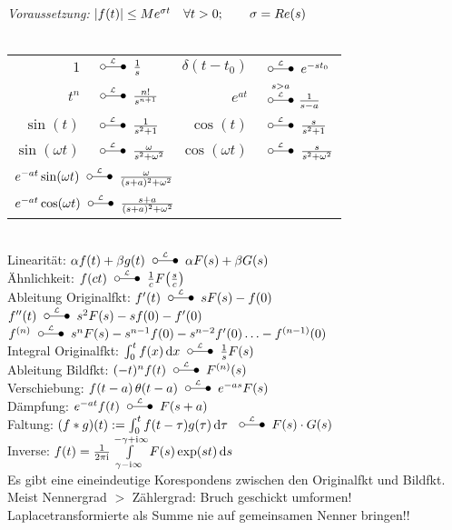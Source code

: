 \documentclass[german,color,6pt]{latex4ei/latex4ei_fs}
\begin{document}
\begin{sectionbox}
		\\
	\emph{Voraussetzung:} $\left\vert f(t)\right\vert \leq M e^{\sigma t} \quad \forall t > 0; \qquad \sigma = Re(s)$\\
	\\
	\everymath{\displaystyle}	%
	\begin{tabular}{rl|rl}
		$1$ & \!\!\!\!\!\!\!\!\!\!$\LT \frac{1}{s}$ & $\delta(t-t_0)$ & \!\!\!\!\!\!\!\!\!\!$\LT e^{-s t_0}$\\[0.2em]
		$t^n$ & \!\!\!\!\!\!\!\!\!\!$\LT \frac{n!}{s^{n+1}}$ & $e^{at}$  & \!\!\!\!\!\!\!\!\!\!$\overset{s > a}{ \LT } \frac{1}{s-a}$\\[0.5em] 
		$\sin(t)$ & \!\!\!\!\!\!\!\!\!\!$\LT \frac{1}{s^2 + 1}$ & $\cos(t)$ & \!\!\!\!\!\!\!\!\!\!$\LT \frac{s}{s^2 + 1}$\\[0.5em]
		$\sin(\omega t)$ & \!\!\!\!\!\!\!\!\!\!$\LT \frac{\omega}{s^2 + \omega^2}$ & $\cos(\omega t)$ & \!\!\!\!\!\!\!\!\!\!$\LT \frac{s}{s^2 + \omega^2}$\\[0.5em]
		\multicolumn{4}{l}{ $e^{-at} \sin(\omega t) \LT \frac{\omega}{(s+a)^2+\omega^2}$} \\
		\multicolumn{4}{l}{ $e^{-at} \cos(\omega t) \LT \frac{s+a}{(s+a)^2+\omega^2}$}\\ 		
		
	\end{tabular}\\
	\everymath{\textstyle}
	Linearität: $\alpha f(t) + \beta g(t) \LT \alpha F(s) + \beta G(s)$\\
	Ähnlichkeit: $f(ct) \LT \frac{1}{c} F\bigl(  \frac{s}{c} \bigr)$\\
	Ableitung Originalfkt: $f'(t) \LT s F(s) - f(0)$ \quad $f''(t) \LT s^2 F(s) - sf(0) - f'(0)$\\
	$f^{(n)} \LT s^n F(s) - s^{n-1} f(0) - s^{n-2} f'(0) \ldots - f^{(n-1)}(0)$\\
	Integral Originalfkt: $\int_0^t f(x) \diff x \LT \frac{1}{s} F(s)$\\
	Ableitung Bildfkt: $(-t)^n f(t) \LT F^{(n)} (s)$\\
	Verschiebung: $f(t-a)\heavi(t-a) \LT e^{-as} F(s)$\\
	Dämpfung: $e^{-at} f(t) \LT F(s+a)$\\
	Faltung: $(f * g)(t) := \int_0^t f( t - \tau) g(\tau) \diff \tau$ $\LT F(s) \cdot G(s)$\\
	Inverse: $f(t) = \frac{1}{2\pi \i} \int\limits_{\gamma - \i \infty}^{-\gamma + \i \infty} F(s) \exp(st) \diff s$\\
	Es gibt eine eineindeutige Korespondens zwischen den Originalfkt und Bildfkt.
	Meist Nennergrad $>$ Zählergrad: Bruch geschickt umformen!
	Laplacetransformierte als Summe nie auf gemeinsamen Nenner bringen!!
\end{sectionbox}
\end{document}
